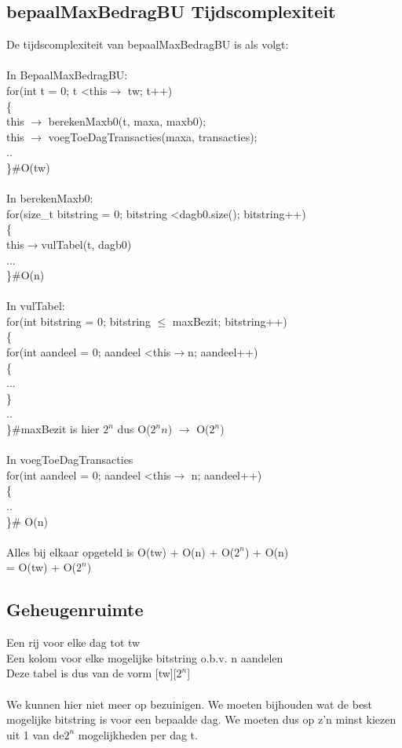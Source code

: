 \documentclass{article}
\begin{document}
\subsection{bepaalMaxBedragBU Tijdscomplexiteit}
De tijdscomplexiteit van bepaalMaxBedragBU is als volgt:\\\\
In BepaalMaxBedragBU:\\
for(int t = 0; t \textless this$\rightarrow$ tw; t++)\\
\{\\
this $\rightarrow$ berekenMaxb0(t, maxa, maxb0);\\
this $\rightarrow$ voegToeDagTransacties(maxa, transacties);\\
..
\\
\}\#O(tw)\\\\
In berekenMaxb0:\\
for(size\_t bitstring = 0; bitstring \textless dagb0.size(); bitstring++)\\
\{\\
  this$\rightarrow$vulTabel(t, dagb0)\\
  ...
\\
\}\#O(n)\\\\
In vulTabel:\\
for(int bitstring = 0; bitstring $\leq$ maxBezit; bitstring++)\\
\{\\
    for(int aandeel = 0; aandeel \textless this$\rightarrow$n; aandeel++)\\
    \{\\
    ...\\
    \}\\
..
\\
\}\#maxBezit is hier $2^{n}$ dus O($2^{n}n$) $\rightarrow$ O($2^{n}$) \\\\
In voegToeDagTransacties\\
for(int aandeel = 0; aandeel \textless this$\rightarrow$ n; aandeel++)\\
\{\\
..
\\
\}\# O(n)\\\\
Alles bij elkaar opgeteld is O(tw) + O(n) + O($2^{n}$) + O(n)\\
= O(tw) + O($2^{n}$)
\newpage
\subsection{Geheugenruimte}
Een rij voor elke dag tot tw\\
Een kolom voor elke mogelijke bitstring o.b.v. n aandelen\\
Deze tabel is dus van de vorm [tw][$2^{n}$]\\\\
We kunnen hier niet meer op bezuinigen. We moeten bijhouden wat de best mogelijke bitstring is voor een bepaalde dag. We moeten dus op z'n minst kiezen uit 1 van de$2^{n}$ mogelijkheden per dag t.
\end{document}
